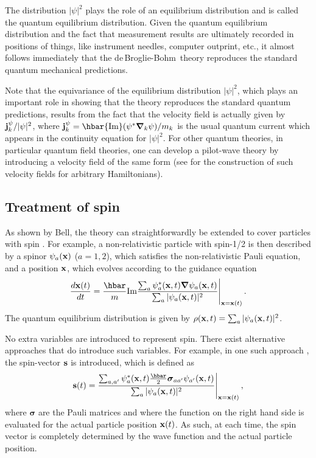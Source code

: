 \documentclass[12pt]{article}
\def\fr{\frac}
\newcommand{\dbb}{de$\,$Broglie-Bohm}
\begin{document}
The distribution $|\psi|^2$ plays the role of an equilibrium distribution and is called the quantum equilibrium distribution. Given the quantum equilibrium distribution and the fact that measurement results are ultimately recorded in positions of things, like instrument needles, computer outprint, etc., it almost follows immediately that the \dbb\ theory reproduces the standard quantum mechanical predictions.

Note that the equivariance of the equilibrium distribution $|\psi|^2$, which plays an important role in showing that the theory reproduces the standard quantum predictions, results from the fact that the velocity field is actually given by $ {\bf j}^\psi_k/|\psi|^2$, where ${\bf j}^\psi_k = \hbar {\textrm{Im}} (\psi^* {\boldsymbol {\nabla}}_k \psi) / m_k$ is the usual quantum current which appears in the continuity equation for $|\psi|^2$. For other quantum theories, in particular quantum field theories, one can develop a pilot-wave theory by introducing a velocity field of the same form (see \cite{struyve09a} for the construction of such velocity fields for arbitrary Hamiltonians). 


\subsection{Treatment of spin}\label{spin}
As shown by Bell, the theory can straightforwardly be extended to cover particles with spin \cite{bell66,bell71}. For example, a non-relativistic particle with spin-1/2 is then described by a spinor $\psi_a({\bf x})$ ($a=1,2$), which satisfies the non-relativistic Pauli equation, and a position ${\bf x}$, which evolves according to the guidance equation
\begin{equation}
\fr{d {\bf x}(t)}{dt} = \frac{\hbar}{m} {\textrm{Im}} \frac{ \sum_a \psi^*_a ({\bf x},t){\boldsymbol {\nabla}} \psi_a ({\bf x},t)}{\sum_a |\psi_a({\bf x},t)|^2} \Bigg|_{{\bf x}={\bf x}(t)}  \,.
\label{3}
\end{equation}
The quantum equilibrium distribution is given by $\rho({\bf x},t) = \sum_a |\psi_a({\bf x},t)|^2$.

No extra variables are introduced to represent spin. There exist alternative approaches that do introduce such variables. For example, in one such approach \cite{dewdney86}, the spin-vector ${\bf s}$ is introduced, which is defined as
\begin{equation}
{\bf s}(t) = \frac{\sum_{a,a'}\psi^*_a({\bf x},t) \frac{\hbar }{2}{\boldsymbol \sigma}_{aa'} \psi_{a'}({\bf x},t)}{\sum_a |\psi_a({\bf x},t)|^2} \Bigg|_{{\bf x}={\bf x}(t)} \,,
\label{4}
\end{equation}
where ${\boldsymbol \sigma}$ are the Pauli matrices and where the function on the right hand side is evaluated for the actual particle position ${\bf x}(t)$. As such, at each time, the spin vector is completely determined by the wave function and the actual particle position. 
\end{document}
